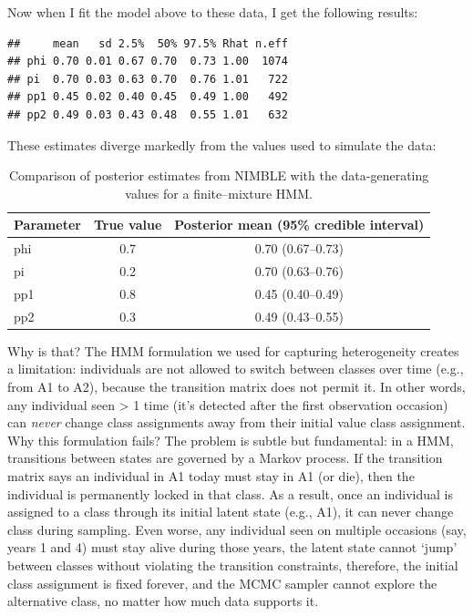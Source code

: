 \documentclass[
  12pt,
]{krantz}
\begin{document}
Now when I fit the model above to these data, I get the following results:

\begin{verbatim}
##     mean   sd 2.5%  50% 97.5% Rhat n.eff
## phi 0.70 0.01 0.67 0.70  0.73 1.00  1074
## pi  0.70 0.03 0.63 0.70  0.76 1.01   722
## pp1 0.45 0.02 0.40 0.45  0.49 1.00   492
## pp2 0.49 0.03 0.43 0.48  0.55 1.01   632
\end{verbatim}

These estimates diverge markedly from the values used to simulate the data:

\begin{table}

\caption{\label{tab:unnamed-chunk-409}Comparison of posterior estimates from NIMBLE with the data-generating values for a finite--mixture HMM.}
\centering
\begin{tabular}[t]{l|c|c}
\hline
Parameter & True value & Posterior mean (95\% credible interval)\\
\hline
phi & 0.7 & 0.70 (0.67–0.73)\\
\hline
pi & 0.2 & 0.70 (0.63–0.76)\\
\hline
pp1 & 0.8 & 0.45 (0.40–0.49)\\
\hline
pp2 & 0.3 & 0.49 (0.43–0.55)\\
\hline
\end{tabular}
\end{table}

Why is that? The HMM formulation we used for capturing heterogeneity creates a limitation: individuals are not allowed to switch between classes over time (e.g., from A1 to A2), because the transition matrix does not permit it. In other words, any individual seen \textgreater{} 1 time (it's detected after the first observation occasion) can \emph{never} change class assignments away from their initial value class assignment. Why this formulation fails? The problem is subtle but fundamental: in a HMM, transitions between states are governed by a Markov process. If the transition matrix says an individual in A1 today must stay in A1 (or die), then the individual is permanently locked in that class. As a result, once an individual is assigned to a class through its initial latent state (e.g., A1), it can never change class during sampling. Even worse, any individual seen on multiple occasions (say, years 1 and 4) must stay alive during those years, the latent state cannot `jump' between classes without violating the transition constraints, therefore, the initial class assignment is fixed forever, and the MCMC sampler cannot explore the alternative class, no matter how much data supports it.
\end{document}
